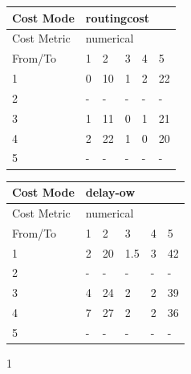 \begin{figure}
    \centering
    \begin{subtable}{.46\linewidth}
        \centering
        \begin{tabular}{|l|l|l|l|l|l|}
        \hline
        Cost Mode   & \multicolumn{5}{|l|}{routingcost} \\ \hline
        Cost Metric & \multicolumn{5}{|l|}{numerical}   \\ \hline
        From/To     & 1    & 2     & 3   & 4   & 5      \\ \hline
        1           & 0    & 10    & 1   & 2   & 22     \\ \hline
        2           & -    & -     & -   & -   & -      \\ \hline
        3           & 1    & 11    & 0   & 1   & 21     \\ \hline
        4           & 2    & 22    & 1   & 0   & 20     \\ \hline
        5           & -    & -     & -   & -   & -      \\ \hline
        \end{tabular}
    \caption{1}
    \end{subtable}
    \begin{subtable}{.46\linewidth}
        \centering
        \begin{tabular}{|l|l|l|l|l|l|}
        \hline
        Cost Mode   & \multicolumn{5}{|l|}{delay-ow}    \\ \hline
        Cost Metric & \multicolumn{5}{|l|}{numerical}   \\ \hline
        From/To     & 1    & 2     & 3   & 4   & 5      \\ \hline
        1           & 2    & 20    & 1.5 & 3   & 42     \\ \hline
        2           & -    & -     & -   & -   & -      \\ \hline
        3           & 4    & 24    & 2   & 2   & 39     \\ \hline
        4           & 7    & 27    & 2   & 2   & 36     \\ \hline
        5           & -    & -     & -   & -   & -      \\ \hline
        \end{tabular}


\end{subtable}
\end{figure}
